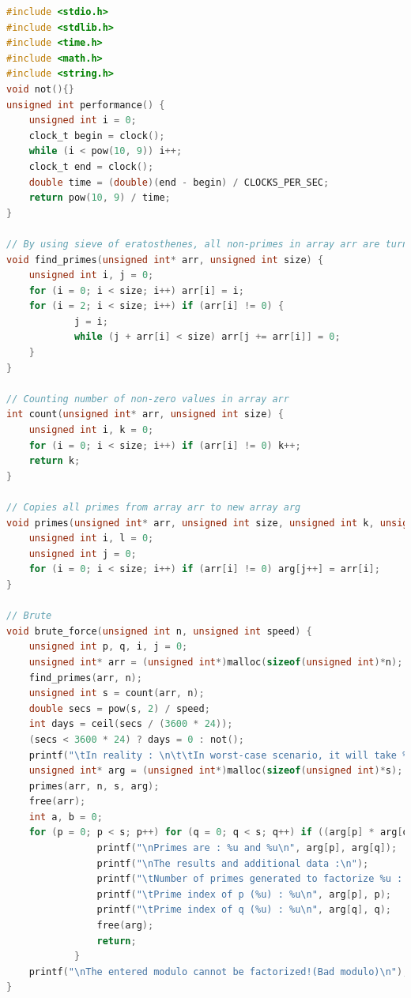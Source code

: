 \documentclass[a4paper, 12pt]{article}
\begin{document}
\begin{lstlisting}[language=C, caption=Source Code of factor-with-primes.c]
#include <stdio.h>
#include <stdlib.h>
#include <time.h>
#include <math.h>
#include <string.h>
void not(){}
unsigned int performance() {
    unsigned int i = 0;
    clock_t begin = clock();
    while (i < pow(10, 9)) i++;
    clock_t end = clock();
    double time = (double)(end - begin) / CLOCKS_PER_SEC;
    return pow(10, 9) / time;
}

// By using sieve of eratosthenes, all non-primes in array arr are turned to 0
void find_primes(unsigned int* arr, unsigned int size) {
    unsigned int i, j = 0;
    for (i = 0; i < size; i++) arr[i] = i;
    for (i = 2; i < size; i++) if (arr[i] != 0) {
            j = i;
            while (j + arr[i] < size) arr[j += arr[i]] = 0;
    }
}

// Counting number of non-zero values in array arr
int count(unsigned int* arr, unsigned int size) {
    unsigned int i, k = 0;
    for (i = 0; i < size; i++) if (arr[i] != 0) k++;
    return k;
}

// Copies all primes from array arr to new array arg
void primes(unsigned int* arr, unsigned int size, unsigned int k, unsigned int* arg) {
    unsigned int i, l = 0;
    unsigned int j = 0;
    for (i = 0; i < size; i++) if (arr[i] != 0) arg[j++] = arr[i];
}

// Brute 
void brute_force(unsigned int n, unsigned int speed) {
    unsigned int p, q, i, j = 0;
    unsigned int* arr = (unsigned int*)malloc(sizeof(unsigned int)*n);
    find_primes(arr, n);
    unsigned int s = count(arr, n);
    double secs = pow(s, 2) / speed;
    int days = ceil(secs / (3600 * 24));
    (secs < 3600 * 24) ? days = 0 : not();
    printf("\tIn reality : \n\t\tIn worst-case scenario, it will take %f seconds or %d day(s)\n", secs, days);
    unsigned int* arg = (unsigned int*)malloc(sizeof(unsigned int)*s);
    primes(arr, n, s, arg);
    free(arr);
    int a, b = 0;
    for (p = 0; p < s; p++) for (q = 0; q < s; q++) if ((arg[p] * arg[q] == n) && (n / arg[p] == arg[q])) {
                printf("\nPrimes are : %u and %u\n", arg[p], arg[q]);
                printf("\nThe results and additional data :\n");
                printf("\tNumber of primes generated to factorize %u : %u\n", n, s);
                printf("\tPrime index of p (%u) : %u\n", arg[p], p);
                printf("\tPrime index of q (%u) : %u\n", arg[q], q);
                free(arg);
                return;
            }
    printf("\nThe entered modulo cannot be factorized!(Bad modulo)\n");
}


\end{lstlisting}
\end{document}
